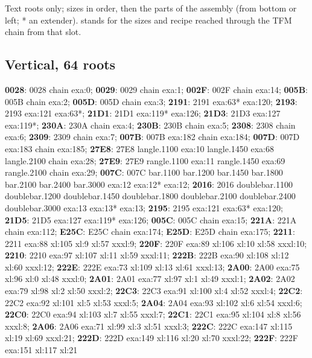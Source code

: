 Text roots only; sizes in order, then the parts of the assembly (from bottom or
left; * an extender).   stands for the sizes and recipe reached
through the TFM chain from that slot.

\subsection*{Vertical, 64 roots}
\raggedright\small \textbf{0028}: 0028 chain exa:0; \textbf{0029}: 0029 chain
exa:1; \textbf{002F}: 002F chain exa:14; \textbf{005B}: 005B chain exa:2;
\textbf{005D}: 005D chain exa:3; \textbf{2191}: 2191 \textbar{} exa:63*
exa:120; \textbf{2193}: 2193 \textbar{} exa:121 exa:63*; \textbf{21D1}: 21D1
\textbar{} exa:119* exa:126; \textbf{21D3}: 21D3 \textbar{} exa:127 exa:119*;
\textbf{230A}: 230A chain exa:4; \textbf{230B}: 230B chain exa:5;
\textbf{2308}: 2308 chain exa:6; \textbf{2309}: 2309 chain exa:7;
\textbf{007B}: 007B exa:182 chain exa:184; \textbf{007D}: 007D exa:183 chain
exa:185; \textbf{27E8}: 27E8 langle.1100 exa:10 langle.1450 exa:68 langle.2100
chain exa:28; \textbf{27E9}: 27E9 rangle.1100 exa:11 rangle.1450 exa:69
rangle.2100 chain exa:29; \textbf{007C}: 007C bar.1100 bar.1200 bar.1450
bar.1800 bar.2100 bar.2400 bar.3000 \textbar{} exa:12 exa:12* exa:12;
\textbf{2016}: 2016 doublebar.1100 doublebar.1200 doublebar.1450 doublebar.1800
doublebar.2100 doublebar.2400 doublebar.3000 \textbar{} exa:13 exa:13* exa:13;
\textbf{2195}: 2195 \textbar{} exa:121 exa:63* exa:120; \textbf{21D5}: 21D5
\textbar{} exa:127 exa:119* exa:126; \textbf{005C}: 005C chain exa:15;
\textbf{221A}: 221A chain exa:112; \textbf{E25C}: E25C chain exa:174;
\textbf{E25D}: E25D chain exa:175; \textbf{2211}: 2211 exa:88 xl:105 xl:9 xl:57
xxxl:9; \textbf{220F}: 220F exa:89 xl:106 xl:10 xl:58 xxxl:10; \textbf{2210}:
2210 exa:97 xl:107 xl:11 xl:59 xxxl:11; \textbf{222B}: 222B exa:90 xl:108 xl:12
xl:60 xxxl:12; \textbf{222E}: 222E exa:73 xl:109 xl:13 xl:61 xxxl:13;
\textbf{2A00}: 2A00 exa:75 xl:96 xl:0 xl:48 xxxl:0; \textbf{2A01}: 2A01 exa:77
xl:97 xl:1 xl:49 xxxl:1; \textbf{2A02}: 2A02 exa:79 xl:98 xl:2 xl:50 xxxl:2;
\textbf{22C3}: 22C3 exa:91 xl:100 xl:4 xl:52 xxxl:4; \textbf{22C2}: 22C2 exa:92
xl:101 xl:5 xl:53 xxxl:5; \textbf{2A04}: 2A04 exa:93 xl:102 xl:6 xl:54 xxxl:6;
\textbf{22C0}: 22C0 exa:94 xl:103 xl:7 xl:55 xxxl:7; \textbf{22C1}: 22C1 exa:95
xl:104 xl:8 xl:56 xxxl:8; \textbf{2A06}: 2A06 exa:71 xl:99 xl:3 xl:51 xxxl:3;
\textbf{222C}: 222C exa:147 xl:115 xl:19 xl:69 xxxl:21; \textbf{222D}: 222D
exa:149 xl:116 xl:20 xl:70 xxxl:22; \textbf{222F}: 222F exa:151 xl:117 xl:21
